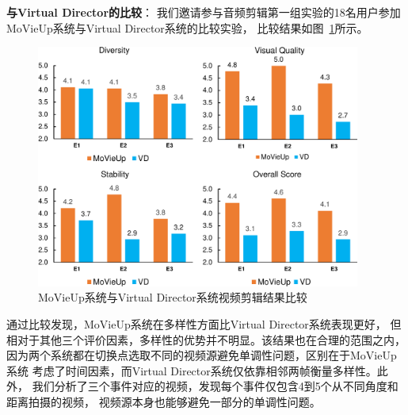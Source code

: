 \documentclass[doctor]{ustcthesis}
\begin{document}
\textbf{与Virtual Director的比较}：
我们邀请参与音频剪辑第一组实验的18名用户参加MoVieUp系统与Virtual Director系统的比较实验，
比较结果如图~\ref{fig:mashup-comp-vd}所示。
\begin{figure}[ht]
    \centering
    \includegraphics[clip=true, width=0.95\textwidth]{mashup-comp-vd.pdf}
    \caption{MoVieUp系统与Virtual Director系统视频剪辑结果比较}
    \label{fig:mashup-comp-vd}
    \vspace{-2em}
\end{figure}

通过比较发现，MoVieUp系统在多样性方面比Virtual Director系统表现更好，
但相对于其他三个评价因素，多样性的优势并不明显。该结果也在合理的范围之内，
因为两个系统都在切换点选取不同的视频源避免单调性问题，区别在于MoVieUp系统
考虑了时间因素，而Virtual Director系统仅依靠相邻两帧衡量多样性。此外，
我们分析了三个事件对应的视频，发现每个事件仅包含4到5个从不同角度和距离拍摄的视频，
视频源本身也能够避免一部分的单调性问题。
\end{document}
